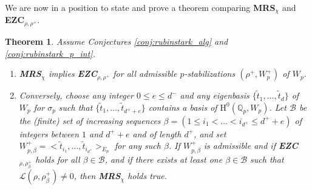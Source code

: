 \documentclass[12pt]{amsart}
\newcommand\Qp{{\mathbb{Q}_p}}
\newcommand\cB{\mathcal{B}}
\newcommand\cL{\mathcal{L}}
\newcommand{\HH}{\mathrm{H}}
\theoremstyle{defstyle}
\theoremstyle{thmstyle}
\newtheorem{theorem}[subsubsection]{Theorem}
\begin{document}
We are now in a position to state and prove a theorem comparing \textbf{MRS}$_\chi$ and \textbf{EZC}$_{\rho,\rho^+}$.

\begin{theorem}\label{thm:equivalence_MRS_EZC}
	Assume Conjectures \ref{conj:rubinstark_alg} and \ref{conj:rubinstark_p_int}.
	\begin{enumerate}
		\item \textbf{MRS}$_\chi$ implies \textbf{EZC}$_{\rho,{\rho}^+}$ for all admissible $p$-stabilizations $(\rho^+,W_p^+)$ of $W_p$.
		\item Conversely, choose any integer $0\leq e \leq d^-$ and any eigenbasis $\{\widetilde{t}_1,\ldots,\widetilde{t}_d\}$ of $W_p$ for $\sigma_p$ such that $\{\widetilde{t}_1,\ldots,\widetilde{t}_{d^++e}\}$ contains a basis of $\HH^0(\Qp,W_p)$. Let $\cB$ be the (finite) set of increasing sequences $\beta=(1\leq i_1<\ldots<i_{d^+}\leq d^++e)$ of integers between $1$ and $d^++e$ and of length $d^+$, and set $W_{p,\beta}^+=<\widetilde{t}_{i_1},\ldots,\widetilde{t}_{i_{d^+}}>_{E_p}$ for any such $\beta$. If $W_{p,\beta}^+$ is admissible and if \textbf{EZC}$_{\rho,{\rho_\beta^+}}$ holds for all $\beta\in \cB$, and if there exists at least one $\beta\in\cB$ such that $\cL(\rho,\rho^+_\beta)\neq 0$, then \textbf{MRS}$_\chi$ holds true.
	\end{enumerate}
\end{theorem}
\end{document}
